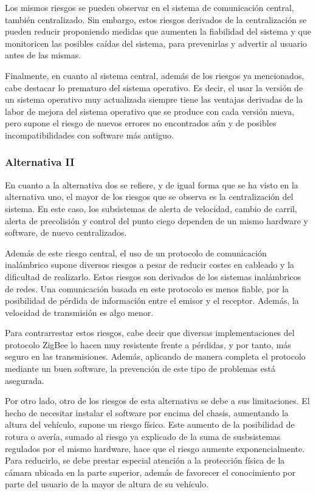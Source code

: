 Los mismos riesgos se pueden observar en el sistema de comunicación central, también centralizado. Sin embargo, estos riesgos derivados de la centralización se pueden reducir proponiendo medidas que aumenten la fiabilidad del sistema y que monitoricen las posibles caídas del sistema, para prevenirlas y advertir al usuario antes de las mismas.


Finalmente, en cuanto al sistema central, además de los riesgos ya mencionados, cabe destacar lo prematuro del sistema operativo. Es decir, el usar la versión de un sistema operativo muy actualizada siempre tiene las ventajas derivadas de la labor de mejora del sistema operativo que se produce con cada versión nueva, pero supone el riesgo de nuevos errores no encontrados aún y de posibles incompatibilidades con software más antiguo.

\subsubsection{Alternativa II}
\par En cuanto a la alternativa dos se refiere, y de igual forma que se ha visto en la alternativa uno, el mayor de los riesgos que se observa es la centralización del sistema. En este caso, los subsistemas de alerta de velocidad, cambio de carril, alerta de precolisión y control del punto ciego dependen de un mismo hardware y software, de nuevo centralizados.

\par Además de este riesgo central, el uso de un protocolo de comunicación inalámbrico supone diversos riesgos a pesar de reducir costes en cableado y la dificultad de realizarlo. Estos riesgos son derivados de los sistemas inalámbricos de redes. Una comunicación basada en este protocolo es menos fiable, por la posibilidad de pérdida de información entre el emisor y el receptor. Además, la velocidad de transmisión es algo menor.

\par Para contrarrestar estos riesgos, cabe decir que diversas implementaciones del protocolo ZigBee lo hacen muy resistente frente a pérdidas, y por tanto, más seguro en las transmisiones. Además, aplicando de manera completa el protocolo mediante un buen software, la prevención de este tipo de problemas está asegurada.

\par Por otro lado, otro de los riesgos de esta alternativa se debe a sus limitaciones. El hecho de necesitar instalar el software por encima del chasis, aumentando la altura del vehículo, supone un riesgo físico. Este aumento de la posibilidad de rotura o avería, sumado al riesgo ya explicado de la suma de susbsistemas regulados por el mismo hardware, hace que el riesgo aumente exponencialmente. Para reducirlo, se debe prestar especial atención a la protección física de la cámara ubicada en la parte superior, además de favorecer el conocimiento por parte del usuario de la mayor de altura de su vehículo.

